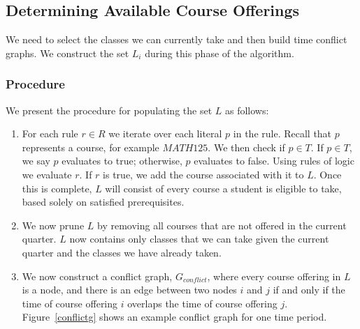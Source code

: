 \documentclass[11pt]{article} %
\begin{document}
\subsection{Determining Available Course Offerings} We need to select the
classes we can currently take and then build time conflict graphs.
We construct the set $L_i$ during this phase of the algorithm.

\subsubsection{Procedure} We present the procedure for populating the set $L$ as
follows: \begin{enumerate} \item For each rule $r \in R$ we iterate over each
literal $p$ in the rule. Recall that $p$ represents a course, for example
$MATH125$. We then check if $p \in T$.  If $p \in T$, we say $p$ evaluates
to true; otherwise, $p$ evaluates to false.  Using rules of logic we evaluate
$r$. If $r$ is true, we add the course associated with it to $L$.  Once this
is complete, $L$ will consist of every course a student is eligible to take, based solely
on satisfied prerequisites.  \item We now prune $L$ by removing all
courses that are not offered in the current quarter. $L$ now contains
only classes that we can take given the current quarter and the classes we have
already taken.  \item We now construct a conflict graph, $G_{conflict}$, where
every course offering in $L$ is a node, and there is an edge between two nodes
$i$ and $j$ if and only if the time of course offering $i$ overlaps the time of
course offering $j$. Figure~\ref{conflictg} shows an example conflict graph for
one time period. \end{enumerate}
\end{document}

